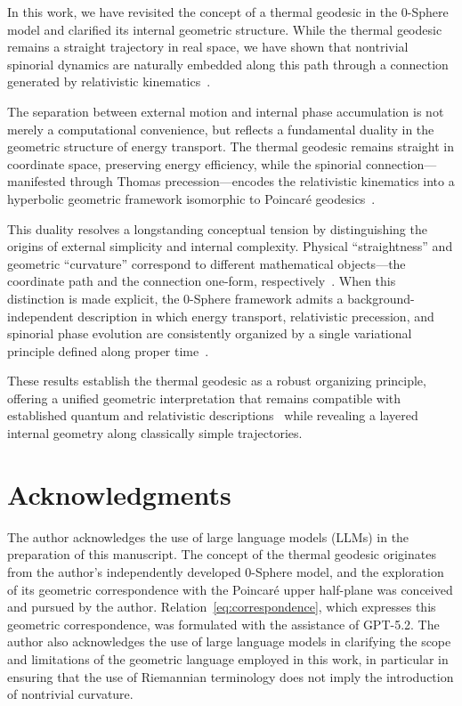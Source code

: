 \documentclass[%
 reprint,
 amsmath,amssymb,
 aps,
 prb,
]{revtex4-2}
\numberwithin{equation}{section}
\begin{document}
In this work, we have revisited the concept of a thermal geodesic in the 0-Sphere model and clarified its internal geometric structure. While the thermal geodesic remains a straight trajectory in real space, we have shown that nontrivial spinorial dynamics are naturally embedded along this path through a connection generated by relativistic kinematics~\cite{thomas1926,bjorken1964}.

The separation between external motion and internal phase accumulation is not merely a computational convenience, but reflects a fundamental duality in the geometric structure of energy transport. The thermal geodesic remains straight in coordinate space, preserving energy efficiency, while the spinorial connection—manifested through Thomas precession—encodes the relativistic kinematics into a hyperbolic geometric framework isomorphic to Poincaré geodesics~\cite{nakahara2003}.

This duality resolves a longstanding conceptual tension by distinguishing the origins of external simplicity and internal complexity. Physical ``straightness'' and geometric ``curvature'' correspond to different mathematical objects—the coordinate path and the connection one-form, respectively~\cite{nakahara2003,berry1984}. When this distinction is made explicit, the 0-Sphere framework admits a background-independent description in which energy transport, relativistic precession, and spinorial phase evolution are consistently organized by a single variational principle defined along proper time~\cite{schwinger1951,feynman1949}.


These results establish the thermal geodesic as a robust organizing principle, offering a unified geometric interpretation that remains compatible with established quantum and relativistic descriptions~\cite{peskin1995,weinberg1995} while revealing a layered internal geometry along classically simple trajectories.

\section*{Acknowledgments}

The author acknowledges the use of large language models (LLMs) in the preparation of this manuscript. The concept of the thermal geodesic originates from the author's independently developed 0-Sphere model, and the exploration of its geometric correspondence with the Poincaré upper half-plane was conceived and pursued by the author. Relation~\eqref{eq:correspondence}, which expresses this geometric correspondence, was formulated with the assistance of GPT-5.2. The author also acknowledges the use of large language models in clarifying the scope and limitations of the geometric language employed in this work, in particular in ensuring that the use of Riemannian terminology does not imply the introduction of nontrivial curvature.
\end{document}
